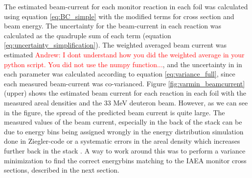 The estimated beam-current for each monitor reaction in each foil was calculated using equation \ref{eq:BC_simple} with the modified terms for cross section and beam energy. The uncertainty for the beam-current in each reaction was calculated as the quadruple sum of each term (equation \ref{eq:uncertainty_simplification}). The weighted averaged beam current was estimated \textcolor{red}{Andrew: I dont understand how you did the weighted average in your python script. You did not use the numpy function...}, and the uncertainty in in each parameter was calculated according to equation \ref{eq:variance_full}, since each measured beam-current was co-varianced. Figure \ref{fig:varmin_beamcurrent} (upper) shows the estimated beam current for each reaction in each foil with the measured areal densities and the 33 MeV deuteron beam. However, as we can see in the figure, the spread of the predicted beam current is quite large. The measured values of the beam current, especially in the back of the stack can be due to energy bins being assigned wrongly in the energy distribution simulation done in Ziegler-code or a systematic errors in the areal density which increases further back in the stack \cite{Voyles2018c}. A way to work around this was to perform a variance minimization to find the correct energybins matching to the IAEA monitor cross sections, described in the next section.  

